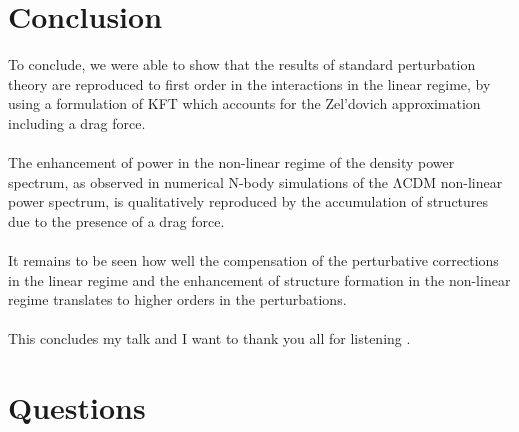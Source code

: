 \section{Conclusion}
To conclude, we were able to show that the results of standard perturbation theory are reproduced to first order in the interactions in the linear regime, by using a formulation of KFT which accounts for the Zel’dovich approximation including a drag force.\\
\\
The enhancement of power in the non-linear regime of the density power spectrum, as
observed in numerical N-body simulations of the ΛCDM non-linear power spectrum, is
qualitatively reproduced by the accumulation of structures due to the presence of a drag
force.\\
\\
It remains to be seen how well the compensation of the perturbative corrections in
the linear regime and the enhancement of structure formation in the non-linear regime
translates to higher orders in the perturbations.
\\
\\
This concludes my talk and I want to thank you all for listening
\newpage.
\section{Questions}

